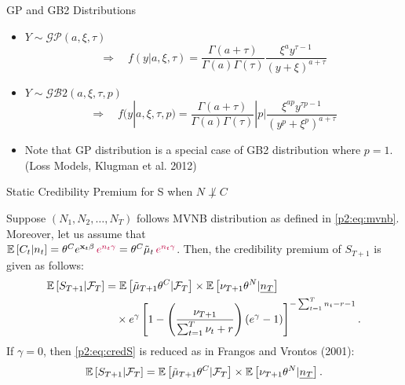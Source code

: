 \documentclass[ignorenonframetext,]{beamer}
\begin{document}
\begin{frame}{GP and GB2 Distributions}
\begin{itemize}
	\item $Y \sim \mathcal{GP}(a, \xi, \tau)$
	$$
	\Longrightarrow \quad f(y|a,\xi,\tau) = \frac{\Gamma(a+\tau)}{\Gamma(a)\Gamma(\tau)}\frac{\xi^a y^{\tau-1}}{(y+\xi)^{a+\tau}}
	$$
	\item $Y \sim \mathcal{GB}2(a, \xi, \tau, p)$
	$$
	\Longrightarrow \quad f(y|a,\xi,\tau,p) = \frac{\Gamma(a+\tau)}{\Gamma(a)\Gamma(\tau)}|p|\frac{\xi^{ap} y^{\tau p-1}}{(y^p+\xi^p)^{a+\tau}}
	$$
	\item Note that GP distribution is a special case of GB2 distribution where $p=1$. (Loss Models, Klugman et al. 2012)
\end{itemize}
\end{frame}

\begin{frame}{Static Credibility Premium for S when $N \not\perp C$}
\begin{theorem}
Suppose $(N_1, N_2, \ldots, N_T)$ follows MVNB distribution as defined in \eqref{p2:eq:mvnb}. Moreover, let us assume that \\
${\mathbb E}\left[C_t|n_t\right] = \theta^C e^{\mathbf{x}_t\beta}\, {\color{purple}e^{n_t\gamma}} = \theta^C \tilde{\mu}_t\, {\color{purple}e^{n_t\gamma}}$. Then, the credibility premium of $S_{T+1}$ is given as follows:
\begin{equation}\label{p2:eq:credS}
\begin{aligned}
{\mathbb E}\left[S_{T+1}|\mathcal{F}_T\right] &= {\mathbb E}\left[\tilde{\mu}_{T+1}\theta^C|\mathcal{F}_T\right] \times {\mathbb E}\left[\nu_{T+1}\theta^N|\underline{n_T}\right] \\
&\quad \times e^\gamma\left[1-\left(\frac{\nu_{T+1}}{\sum_{t=1}^T \nu_t + r}\right)(e^\gamma - 1)\right]^{-\sum_{t=1}^T n_t - r - 1}.
\end{aligned}
\end{equation}
If $\gamma=0$, then \eqref{p2:eq:credS} is reduced as in Frangos and Vrontos (2001):
$$
{\mathbb E}\left[S_{T+1}|\mathcal{F}_T\right] = {\mathbb E}\left[\tilde{\mu}_{T+1}\theta^C|\mathcal{F}_T\right] \times {\mathbb E}\left[\nu_{T+1}\theta^N|\underline{n_T}\right].
$$
\end{theorem}
\end{frame}
\end{document}
